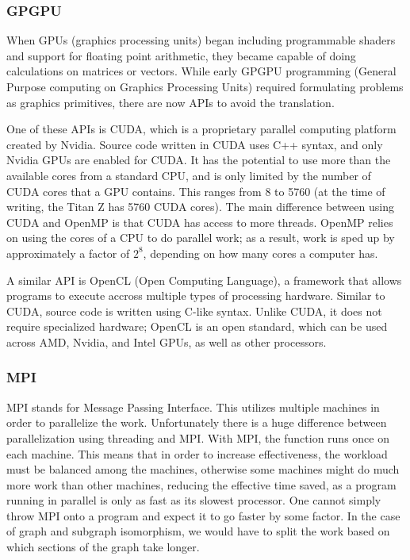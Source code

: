 \documentclass{article}
\begin{document}
    \subsubsection{GPGPU}
    When GPUs (graphics processing units) began including programmable shaders and support for floating point arithmetic, they became capable of doing calculations on matrices or vectors. While early GPGPU programming (General Purpose computing on Graphics Processing Units) required formulating problems as graphics primitives, there are now APIs to avoid the translation.

    One of these APIs is CUDA, which is a proprietary parallel computing platform created by Nvidia. Source code written in CUDA uses C++ syntax, and only Nvidia GPUs are enabled for CUDA. It has the potential to use more than the available cores from a standard CPU, and is only limited by the number of CUDA cores that a GPU contains. This ranges from 8 to 5760 (at the time of writing, the Titan Z has 5760 CUDA cores). The main difference between using CUDA and OpenMP is that CUDA has access to more threads. OpenMP relies on using the cores of a CPU to do parallel work; as a result, work is sped up by approximately a factor of $2^8$, depending on how many cores a computer has.

    A similar API is OpenCL (Open Computing Language), a framework that allows programs to execute accross multiple types of processing hardware. Similar to CUDA, source code is written using C-like syntax. Unlike CUDA, it does not require specialized hardware; OpenCL is an open standard, which can be used across AMD, Nvidia, and Intel GPUs, as well as other processors.

    \subsubsection{MPI}
    MPI stands for Message Passing Interface. This utilizes multiple machines in order to parallelize the work. Unfortunately there is a huge difference between parallelization using threading and MPI. With MPI, the function runs once on each machine. This means that in order to increase effectiveness, the workload must be balanced among the machines, otherwise some machines might do much more work than other machines, reducing the effective time saved, as a program running in parallel is only as fast as its slowest processor. One cannot simply throw MPI onto a program and expect it to go faster by some factor. In the case of graph and subgraph isomorphism, we would have to split the work based on which sections of the graph take longer.
\end{document}
